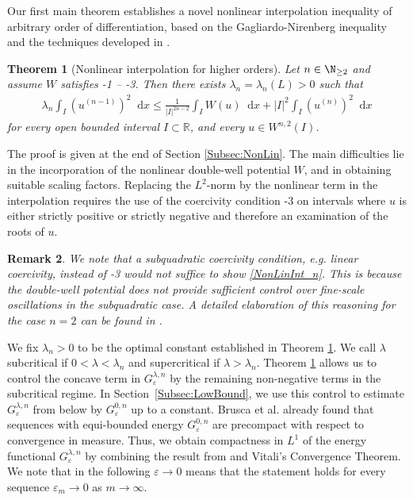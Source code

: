 \documentclass{article}
\newcommand{\dd}{\mathop{}\mathrm{d}} %
\newcommand{\lam}{\lambda}
\newcommand{\eps}{\varepsilon}
\numberwithin{figure}{section}
\newcommand{\R}{\mathbb{R}}
\newtheorem{theorem}{Theorem}[section]
\newtheorem{rem}[theorem]{Remark}
\numberwithin{equation}{section}
\begin{document}
Our first main theorem establishes a novel nonlinear interpolation inequality of arbitrary order of differentiation, based on the Gagliardo-Nirenberg inequality \cite{Gag,Nir59} and the techniques developed in \cite[Section~3]{CicSpaZep}.

\begin{theorem}[Nonlinear interpolation for higher orders] \label{Theo:NonLinInt_n}
Let $n \in \N_{\geq2}$ and assume $W$ satisfies \hyp1 -- \hyp3. Then there exists $\lam_n = \lam_n(L)>0$ such that
    \begin{align} \label{NonLinInt_n}
        \lam_n \int_I (u^{(n-1)})^2\dd x \leq \frac 1{|I|^{2n-2}} \int_I W(u)\dd x + |I|^2 \int_I (u^{(n)})^2\dd x
    \end{align}
for every open bounded interval $I \subset \R$, and every $u \in W^{n,2}(I)$.
\end{theorem}

The proof is given at the end of Section \ref{Subsec:NonLin}. The main difficulties lie in the incorporation of the nonlinear double-well potential $W$, and in obtaining suitable scaling factors. Replacing the $L^2$-norm by the nonlinear term in the interpolation requires the use of the coercivity condition \hyp3 on intervals where $u$ is either strictly positive or strictly negative and therefore an examination of the roots of $u$.

\begin{rem}
    We note that a subquadratic coercivity condition, e.g. linear coercivity, instead of \hyp3 would not suffice to show \eqref{NonLinInt_n}. This is because the double-well potential does not provide sufficient control over fine-scale oscillations in the subquadratic case. A detailed elaboration of this reasoning for the case $n=2$ can be found in \cite[Section 3.1]{CicSpaZep}.
\end{rem}

We fix $\lam_n > 0$ to be the optimal constant established in Theorem \ref{Theo:NonLinInt_n}. We call $\lam$ subcritical if $0 < \lam < \lam_n$ and supercritical if $\lam > \lam_n$. Theorem \ref{Theo:NonLinInt_n} allows us to control the concave term in $G_\eps^{\lam,n}$ by the remaining non-negative terms in the subcritical regime. In Section~\ref{Subsec:LowBound}, we use this control to estimate $G^{\lam,n}_\eps$ from below by $G^{0,n}_\eps$ up to a constant. Brusca et al. \cite{BruDonSol} already found that sequences with equi-bounded energy $G^{0,n}_\eps$ are precompact with respect to convergence in measure. Thus, we obtain compactness in $L^1$ of the energy functional $G_\eps^{\lam,n}$ by combining the result from \cite{BruDonSol} and Vitali's Convergence Theorem. We note that in the following $\eps \to 0$ means that the statement holds for every sequence $\eps_m \to 0$ as $m \to \infty$.
\end{document}
